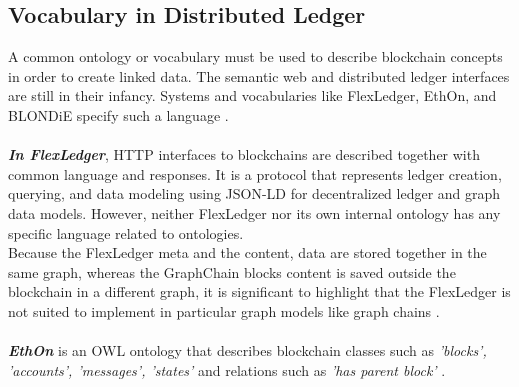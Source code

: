 \subsection{Vocabulary in Distributed Ledger}
A common ontology or vocabulary must be used to describe blockchain concepts in order to create linked data. The semantic web and distributed ledger interfaces are still in their infancy. Systems and vocabularies like FlexLedger, EthOn, and BLONDiE specify such a language \cite{Third}.\\
\\
\textbf{\textit{In FlexLedger}}, HTTP interfaces to blockchains are described together with common language and responses. It is a protocol that represents ledger creation, querying, and data modeling using JSON-LD for decentralized ledger and graph data models. However, neither FlexLedger nor its own internal ontology has any specific language related to ontologies. \\
Because the FlexLedger meta and the content, data are stored together in the same graph, whereas the GraphChain blocks content is saved outside the blockchain in a different graph, it is significant to highlight that the FlexLedger is not suited to implement in particular graph models like graph chains \cite{Sopek}.\\
\\
\textbf{\textit{EthOn}} is an OWL ontology that describes blockchain classes such as \textit{'blocks', 'accounts', 'messages', 'states'} and relations such as \textit{'has parent block'} \cite{Rashid}.
